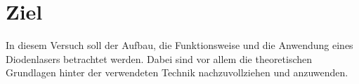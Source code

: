 \section{Ziel}
In diesem Versuch soll der Aufbau, die Funktionsweise und die Anwendung eines Diodenlasers betrachtet werden. 
Dabei sind vor allem die theoretischen Grundlagen hinter der verwendeten Technik nachzuvollziehen und anzuwenden.

